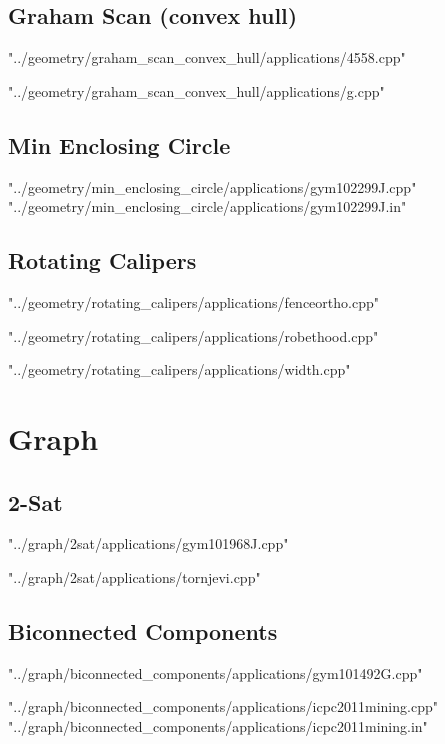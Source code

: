 \documentclass [12pt,onecolumn,oneside]{article}
\begin{document}
\subsection{ Graham Scan (convex hull)}
 {"../geometry/graham_scan_convex_hull/applications/4558.cpp"}
\newpage

 {"../geometry/graham_scan_convex_hull/applications/g.cpp"}
\newpage

\subsection{ Min Enclosing Circle}
 {"../geometry/min_enclosing_circle/applications/gym102299J.cpp"}
 {"../geometry/min_enclosing_circle/applications/gym102299J.in"}
\newpage

\subsection{ Rotating Calipers}
 {"../geometry/rotating_calipers/applications/fenceortho.cpp"}
\newpage

 {"../geometry/rotating_calipers/applications/robethood.cpp"}
\newpage

 {"../geometry/rotating_calipers/applications/width.cpp"}
\newpage


\section{Graph}
\subsection{ 2-Sat}
 {"../graph/2sat/applications/gym101968J.cpp"}
\newpage

 {"../graph/2sat/applications/tornjevi.cpp"}
\newpage

\subsection{ Biconnected Components}
 {"../graph/biconnected_components/applications/gym101492G.cpp"}
\newpage

 {"../graph/biconnected_components/applications/icpc2011mining.cpp"}
 {"../graph/biconnected_components/applications/icpc2011mining.in"}
\newpage
\end{document}
